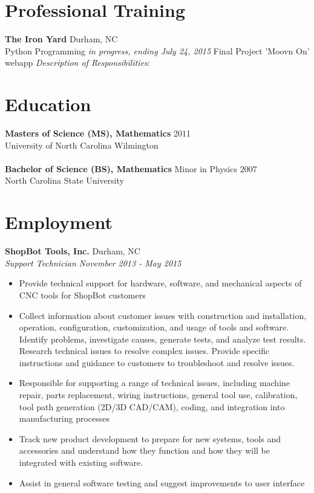 \documentclass[10pt]{article}
\begin{document}
\section*{Professional Training}

{\bf The Iron Yard} \hfill Durham, NC\\
Python Programming \hfill {\it in progress, ending July 24, 2015}
Final Project \hfill 'Moovn On' webapp
{\it Description of Responsibilities}:


\section*{Education}

{\bf Masters of Science (MS), Mathematics} \hfill 2011\\
University of North Carolina Wilmington\\
\\
{\bf Bachelor of Science (BS), Mathematics} Minor in Physics \hfill 2007\\
North Carolina State University


\section*{Employment}


\noindent
{\bf ShopBot Tools, Inc.} \hfill Durham, NC\\
{\it Support Technician} \hfill {\it November 2013 - May 2015}

\begin{itemize}

\item Provide technical support for hardware, software, and mechanical
aspects of CNC tools for ShopBot customers

\item Collect information about customer issues with construction and
installation, operation, configuration, customization, and usage of tools
and software. Identify problems, investigate causes, generate tests,
and analyze test results. Research technical issues to resolve complex
issues. Provide specific instructions and guidance to customers to
troubleshoot and resolve issues.

\item Responsible for supporting a range of technical issues, including
machine repair, parts replacement, wiring instructions, general tool use,
calibration, tool path generation (2D/3D CAD/CAM), coding, and integration
into manufacturing processes

\item Track new product development to prepare for new systems, tools and
accessories and understand how they function and how they will be integrated
  with existing software.
\item Assist in general software testing and suggest improvements to user
interface

\end{itemize}
\end{document}
